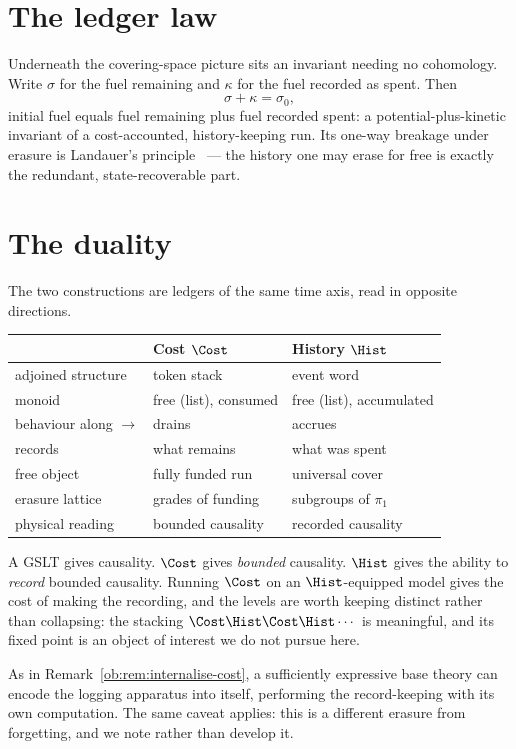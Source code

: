 \section{The ledger law}

Underneath the covering-space picture sits an invariant needing no cohomology. Write
$\sigma$ for the fuel remaining and $\kappa$ for the fuel recorded as spent. Then
\[
  \sigma + \kappa = \sigma_0 ,
\]
initial fuel equals fuel remaining plus fuel recorded spent: a potential-plus-kinetic
invariant of a cost-accounted, history-keeping run. Its one-way breakage under erasure is
Landauer's principle~\cite{Landauer} --- the history one may erase for free is exactly
the redundant, state-recoverable part.

\section{The duality}

The two constructions are ledgers of the same time axis, read in opposite directions.

\begin{center}
\begin{tabular}{@{}lll@{}}
\toprule
& \textbf{Cost $\Cost$} & \textbf{History $\Hist$} \\
\midrule
adjoined structure & token stack & event word \\
monoid             & free (list), consumed & free (list), accumulated \\
behaviour along $\longrightarrow$ & drains & accrues \\
records            & what remains & what was spent \\
free object        & fully funded run & universal cover \\
erasure lattice    & grades of funding & subgroups of $\pi_1$ \\
physical reading   & bounded causality & recorded causality \\
\bottomrule
\end{tabular}
\end{center}

A GSLT gives causality. $\Cost$ gives \emph{bounded} causality. $\Hist$ gives the ability
to \emph{record} bounded causality. Running $\Cost$ on an $\Hist$-equipped model gives the
cost of making the recording, and the levels are worth keeping distinct rather than
collapsing: the stacking $\Cost\Hist\Cost\Hist\cdots$ is meaningful, and its fixed point
is an object of interest we do not pursue here.

\begin{remark}
As in Remark~\ref{ob:rem:internalise-cost}, a sufficiently expressive base theory can encode
the logging apparatus into itself, performing the record-keeping with its own
computation. The same caveat applies: this is a different erasure from forgetting, and we
note rather than develop it.
\end{remark}
